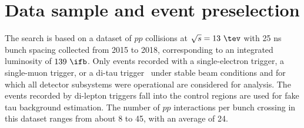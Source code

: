 \section{Data sample and event preselection}
\label{sec:data_presel}

The search is based on a dataset of $pp$ collisions at $\sqrt{s}=13~\tev$ with 25 ns bunch spacing collected from 2015 to 2018, corresponding to an integrated luminosity of $139~\ifb$.
Only events recorded with a single-electron trigger, a single-muon trigger, or a di-tau trigger~\cite{TRIG-2018-05,TRIG-2018-01,id_trigger,l1topo_trigger} under stable beam conditions 
and for which all detector subsystems were operational are considered for analysis. The events recorded by di-lepton triggers fall into the control regions are used for fake tau background
estimation. The number of $pp$ interactions per bunch crossing in this dataset ranges from about 8 to 45, with an average of 24.

